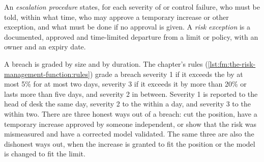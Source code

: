\begin{definition}\label{def:fm:the-risk-management-function:escalation}
An \emph{escalation procedure} states, for each severity of  or control failure, who must be told, within
what time, who may approve a temporary increase or other exception, and what must be done if no approval is given. A \emph{risk exception} is a documented, approved and time-limited departure from a limit or policy, with an owner and an expiry date.
\end{definition}

A breach is graded by size and by duration. The chapter's rules (\cref{lst:fm:the-risk-management-function:rules}) grade a breach severity 1 if
it exceeds the  by at most 5\% for at most two days, severity 3 if it exceeds it by more than 20\% or lasts more than five days, and
severity 2 in between. Severity 1 is reported to the head of desk the same day, severity 2 to the  within a day, and severity 3 to
the  within two. There are three honest ways out of a breach: cut the position, have a temporary increase approved by someone
independent, or show that the risk was mismeasured and have a corrected model validated. The same three are also the dishonest ways out, when the
increase is granted to fit the position or the model is changed to fit the limit.

\label{lst:fm:the-risk-management-function:rules}

